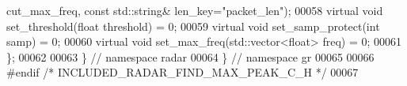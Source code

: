 \begin{DoxyCode}
      cut\_max\_freq, \textcolor{keyword}{const} std::string& len\_key=\textcolor{stringliteral}{"packet\_len"});
00058       \textcolor{keyword}{virtual} \textcolor{keywordtype}{void} set\_threshold(\textcolor{keywordtype}{float} threshold) = 0;
00059       \textcolor{keyword}{virtual} \textcolor{keywordtype}{void} set\_samp\_protect(\textcolor{keywordtype}{int} samp) = 0;
00060       \textcolor{keyword}{virtual} \textcolor{keywordtype}{void} set\_max\_freq(std::vector<float> freq) = 0;
00061     \};
00062 
00063   \} \textcolor{comment}{// namespace radar}
00064 \} \textcolor{comment}{// namespace gr}
00065 
00066 \textcolor{preprocessor}{#endif }\textcolor{comment}{/* INCLUDED\_RADAR\_FIND\_MAX\_PEAK\_C\_H */}\textcolor{preprocessor}{}
00067 
\end{DoxyCode}
